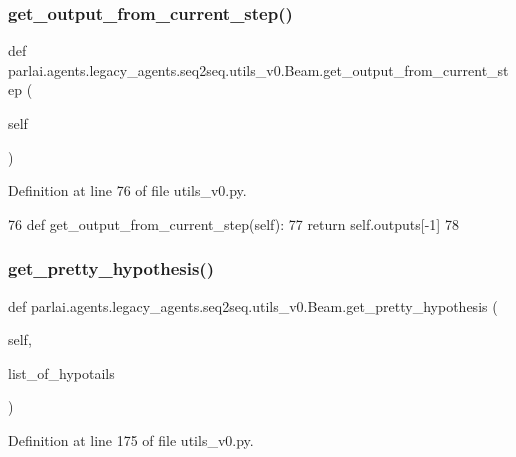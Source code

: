 \subsubsection{\texorpdfstring{get\+\_\+output\+\_\+from\+\_\+current\+\_\+step()}{get\_output\_from\_current\_step()}}
{\footnotesize\ttfamily def parlai.\+agents.\+legacy\+\_\+agents.\+seq2seq.\+utils\+\_\+v0.\+Beam.\+get\+\_\+output\+\_\+from\+\_\+current\+\_\+step (\begin{DoxyParamCaption}\item[{}]{self }\end{DoxyParamCaption})}



Definition at line 76 of file utils\+\_\+v0.\+py.


\begin{DoxyCode}
76     \textcolor{keyword}{def }get\_output\_from\_current\_step(self):
77         \textcolor{keywordflow}{return} self.outputs[-1]
78 
\end{DoxyCode}
\mbox{\label{classparlai_1_1agents_1_1legacy__agents_1_1seq2seq_1_1utils__v0_1_1Beam_a9e16b7ec90640b527d75642fe93c6417}} 
\subsubsection{\texorpdfstring{get\+\_\+pretty\+\_\+hypothesis()}{get\_pretty\_hypothesis()}}
{\footnotesize\ttfamily def parlai.\+agents.\+legacy\+\_\+agents.\+seq2seq.\+utils\+\_\+v0.\+Beam.\+get\+\_\+pretty\+\_\+hypothesis (\begin{DoxyParamCaption}\item[{}]{self,  }\item[{}]{list\+\_\+of\+\_\+hypotails }\end{DoxyParamCaption})}



Definition at line 175 of file utils\+\_\+v0.\+py.


